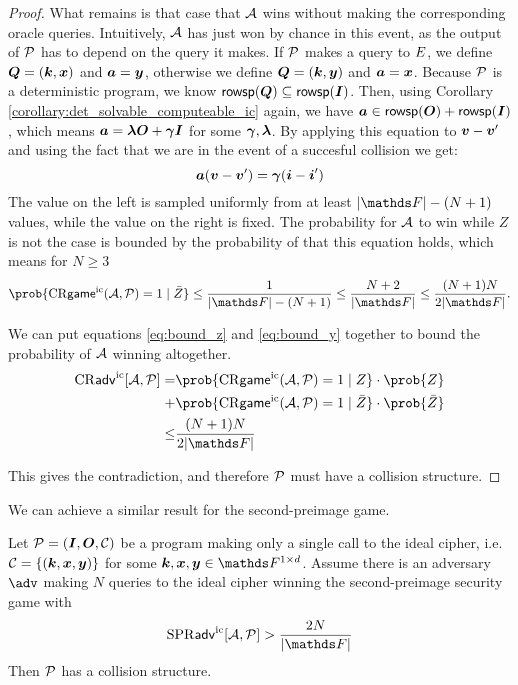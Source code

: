 \begin{proof}
    What remains is that case that $\A$ wins without making the corresponding oracle queries.
    Intuitively, $\A$ has just won by chance in this event, as the output of $\P$ has to depend on the query it makes.
    If $\P$ makes a query to $\E$, we define $\Q = (\vk, \vx)$ and $\va = \vy$, otherwise we define $\Q = (\vk, \vy)$ and $\va = \vx$.
    Because $\P$ is a deterministic program, we know $\rowsp(\Q) \subseteq \rowsp(\I)$.
    Then, using Corollary \ref{corollary:det_solvable_computeable_ic} again, we have
    $\va \in \rowsp(\O) + \rowsp(\I)$, which means $\va = \v\lambda \O + \v\gamma \I$ for some $\v\gamma, \v\lambda$.
    By applying this equation to $\vv - \vv'$ and using the fact that we are in the event of a succesful collision we get:
    \[
    \va(\vv - \vv') = \v\gamma (\vi - \vi')
    \]
    The value on the left is sampled uniformly from at least $|\F| - (N+1)$ values, while the value on the right is fixed.
    The probability for $\A$ to win while $Z$ is not the case is bounded by the probability of that this equation holds,
    which means for $N \geq 3$
    \begin{equation}
    \label{eq:bound_y}
        \prob{\crgame(\A, \P) = 1 \mid \bar{Z}} \leq \frac{1}{|\F| - (N+1)} \leq \frac{N+2}{|\F|} \leq \frac{(N+1)N}{2|\F|}.
    \end{equation}
    
    We can put equations \eqref{eq:bound_z} and \eqref{eq:bound_y} together to bound the probability of $\A$ winning altogether.
    \begin{align*}
    \cradv{\A, \P} = & \prob{\crgame(\A, \P) = 1 \mid Z}\cdot \prob{Z} \\
    + & \prob{\crgame(\A, \P) = 1 \mid \bar{Z}}\cdot \prob{\bar{Z}} \\
    \leq & \frac{(N+1)N}{2|\F|}
    \end{align*}
    
    This gives the contradiction, and therefore $\P$ must have a collision structure.
\end{proof}

We can achieve a similar result for the second-preimage game.

\begin{prop}
\label{prop:single_query_spr_resistance}
    Let $\P = (\I, \O, \C)$ be a program making only a single call to the ideal cipher,
    i.e. $\C = \{ (\vk, \vx, \vy)\}$ for some $\vk, \vx, \vy \in \Frowsp$.
    Assume there is an adversary $\adv$ making $N$ queries to the ideal cipher winning the second-preimage security game with
    \[
        \spradv{\A, \P} > \frac{2N}{|\F|}
    \]
    Then $\P$ has a collision structure.
\end{prop}

